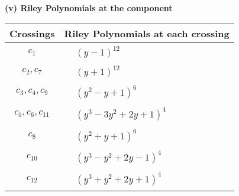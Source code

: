 \documentclass[1p]{elsarticle_modified}
\theoremstyle{definition}
\begin{document}
\newpage\renewcommand{\arraystretch}{1}
\flushleft \textbf{(v) Riley Polynomials at the component}\newline \\
\begin{tabular}{m{50pt}|m{274pt}}
Crossings & \hspace{64pt}Riley Polynomials at each crossing \\
\hline $$\begin{aligned}c_{1}\end{aligned}$$&$\begin{aligned}
&(y-1)^{12}
\end{aligned}$\\
\hline $$\begin{aligned}c_{2},c_{7}\end{aligned}$$&$\begin{aligned}
&(y+1)^{12}
\end{aligned}$\\
\hline $$\begin{aligned}c_{3},c_{4},c_{9}\end{aligned}$$&$\begin{aligned}
&(y^2- y+1)^6
\end{aligned}$\\
\hline $$\begin{aligned}c_{5},c_{6},c_{11}\end{aligned}$$&$\begin{aligned}
&(y^3-3 y^2+2 y+1)^4
\end{aligned}$\\
\hline $$\begin{aligned}c_{8}\end{aligned}$$&$\begin{aligned}
&(y^2+y+1)^6
\end{aligned}$\\
\hline $$\begin{aligned}c_{10}\end{aligned}$$&$\begin{aligned}
&(y^3- y^2+2 y-1)^4
\end{aligned}$\\
\hline $$\begin{aligned}c_{12}\end{aligned}$$&$\begin{aligned}
&(y^3+y^2+2 y+1)^4
\end{aligned}$\\
\hline
\end{tabular}\\~\\
\end{document}

